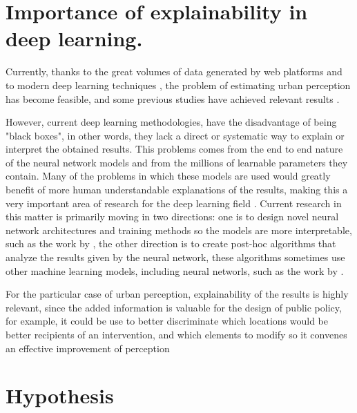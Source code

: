 \section{Importance of explainability in deep learning.}

Currently, thanks to the great volumes of data generated by web platforms \cite{hidalgo_inequality}
and to modern deep learning techniques \cite{lecun_dl}, the problem of estimating urban perception
has become feasible, and some previous studies have achieved relevant results \cite{hidalgo_placepulse,rossetti}.

However, current deep learning methodologies, have the disadvantage of being "black boxes", in other
words, they lack a direct or systematic way to explain or interpret the obtained results. This problems
comes from the end to end nature of the neural network models and from the millions of learnable parameters
they contain. Many of the problems in which these models are used would greatly benefit of more
human understandable explanations of the results, making this a very important area of
research for the deep learning field \cite{adadi_xai}.  Current research in this matter is primarily
moving in two directions: one is to design novel neural network architectures and training methods so
the models are more interpretable, such as the work by , the other
direction is to  create post-hoc algorithms \cite{adadi_xai} that analyze the results given by the
neural network, these algorithms sometimes use other machine learning models, including neural networls,
such as the work by .

For the particular case of urban perception, explainability of the results is highly relevant, since
the added information is valuable for the design of public policy, for example, it could be use to
better discriminate which locations would be better recipients of an intervention, and which elements
to modify so it convenes an effective improvement of perception

\section{Hypothesis}